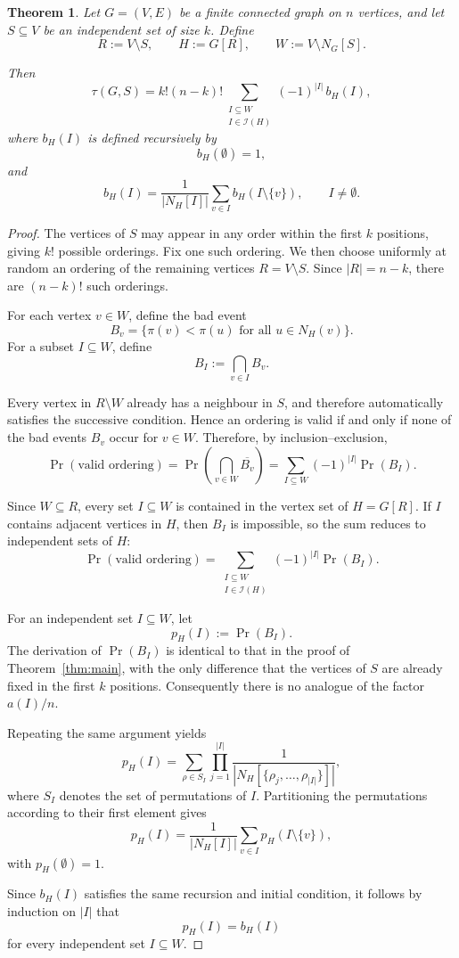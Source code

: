 \documentclass[11pt,a4paper]{article}
\numberwithin{equation}{section}
\theoremstyle{plain}
\newtheorem{theorem}{Theorem}[section]
\theoremstyle{definition}
\theoremstyle{remark}
\begin{document}
\begin{theorem}
\label{thm:multiseed}
Let \(G=(V,E)\) be a finite connected graph on \(n\) vertices, and let \(S\subseteq V\) be an independent set of size \(k\). Define
\[
R:=V\setminus S,
\qquad
H:=G[R],
\qquad
W:=V\setminus N_G[S].
\]

Then
\[
\tau(G,S)
=
k!(n-k)!
\sum_{\substack{I\subseteq W\\ I\in\mathcal I(H)}}
(-1)^{|I|}
\,b_H(I),
\]
where \(b_H(I)\) is defined recursively by
\[
b_H(\emptyset)=1,
\]
and
\[
b_H(I)
=
\frac{1}{|N_H[I]|}
\sum_{v\in I}
b_H(I\setminus\{v\}),
\qquad
I\neq\emptyset.
\]
\end{theorem}

\begin{proof}
The vertices of \(S\) may appear in any order within the first \(k\) positions, giving \(k!\) possible orderings. Fix one such ordering. We then choose uniformly at random an ordering of the remaining vertices \(R=V\setminus S\). Since \(|R|=n-k\), there are \((n-k)!\) such orderings.

For each vertex \(v\in W\), define the bad event
\[
B_v
=
\{
\pi(v)<\pi(u)
\text{ for all }
u\in N_H(v)
\}.
\]
For a subset \(I\subseteq W\), define
\[
B_I:=\bigcap_{v\in I} B_v.
\]

Every vertex in \(R\setminus W\) already has a neighbour in \(S\), and therefore automatically satisfies the successive condition. Hence an ordering is valid if and only if none of the bad events \(B_v\) occur for \(v\in W\). Therefore, by inclusion--exclusion,
\[
\Pr(\text{valid ordering})
=
\Pr\!\left(\bigcap_{v\in W}\overline{B_v}\right)
=
\sum_{I\subseteq W}
(-1)^{|I|}
\Pr(B_I).
\]

Since \(W\subseteq R\), every set \(I\subseteq W\) is contained in the vertex set of \(H=G[R]\). If \(I\) contains adjacent vertices in \(H\), then \(B_I\) is impossible, so the sum reduces to independent sets of \(H\):
\[
\Pr(\text{valid ordering})
=
\sum_{\substack{I\subseteq W\\ I\in\mathcal I(H)}}
(-1)^{|I|}
\Pr(B_I).
\]

For an independent set \(I\subseteq W\), let
\[
p_H(I):=\Pr(B_I).
\]
The derivation of \(\Pr(B_I)\) is identical to that in the proof of
Theorem~\ref{thm:main}, with the only difference that the vertices of
\(S\) are already fixed in the first \(k\) positions. Consequently there
is no analogue of the factor \(a(I)/n\).

Repeating the same argument yields
\[
p_H(I)
=
\sum_{\rho\in S_I}
\prod_{j=1}^{|I|}
\frac{1}
{|N_H[\{\rho_j,\dots,\rho_{|I|}\}]|},
\]
where \(S_I\) denotes the set of permutations of \(I\).
Partitioning the permutations according to their first element gives
\[
p_H(I)
=
\frac{1}{|N_H[I]|}
\sum_{v\in I}
p_H(I\setminus\{v\}),
\]
with \(p_H(\emptyset)=1\).

Since \(b_H(I)\) satisfies the same recursion and initial condition,
it follows by induction on \(|I|\) that
\[
p_H(I)=b_H(I)
\]
for every independent set \(I \subseteq W\).

\end{proof}
\end{document}
